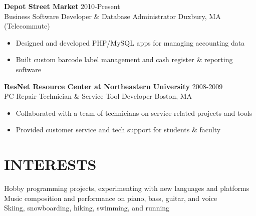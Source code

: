 \documentclass[line,margin]{res}
\begin{document}
\begin{resume}
    {\large \textbf{Depot Street Market}}
    \hfill 2010-Present \\
    Business Software Developer \& Database Administrator
    \hfill Duxbury, MA {\footnotesize (Telecommute)}
    \begin{itemize}  \itemsep -2pt %
        \item Designed and developed PHP/MySQL apps for managing accounting data
        \item Built custom barcode label management and cash register \& reporting software
    \end{itemize}

    {\large \textbf{ResNet Resource Center at Northeastern University}}
    \hfill 2008-2009 \\
    PC Repair Technician \& Service Tool Developer
    \hfill Boston, MA
    \begin{itemize}  \itemsep -2pt %
        \item Collaborated with a team of technicians on service-related projects and tools
        \item Provided customer service and tech support for students \& faculty
    \end{itemize}

\section{INTERESTS}
    Hobby programming projects, experimenting with new languages and platforms \\
    Music composition and performance on piano, bass, guitar, and voice \\
    Skiing, snowboarding, hiking, swimming, and running

\end{resume}
\end{document}
